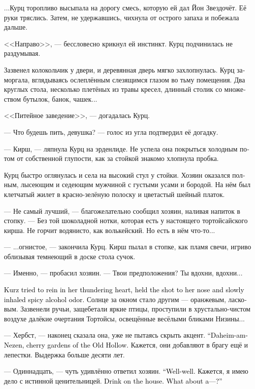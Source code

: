 \documentclass[a4paper,12pt,fleqn]{book}\usepackage{cooltooltips}\usepackage{polyglossia}\setdefaultlanguage[babelshorthands=true]{russian}\setotherlanguage{english}\defaultfontfeatures{Ligatures=TeX,Mapping=tex-text} \usepackage{xcolor}\definecolor{lightgray}{HTML}{bbbbbb}\color{lightgray}\newcommand{\ml}[3]{\textenglish{\textcolor{black}{#3}}}
\begin{document}
...Курц торопливо высыпала на дорогу смесь, которую ей дал Йон Звездочёт.
Её руки тряслись.
Затем, не удержавшись, чихнула от острого запаха и побежала дальше.

<<Направо>>, --- бессловесно крикнул ей инстинкт.
Курц подчинилась не раздумывая.

Зазвенел колокольчик у двери, и деревянная дверь мягко захлопнулась.
Курц заморгала, вглядываясь ослеплённым слезящимся глазом во тьму помещения.
Два круглых стола, несколько плетёных из травы кресел, длинный столик со множеством бутылок, банок, чашек...

<<Питейное заведение>>, --- догадалась Курц.

--- Что будешь пить, девушка? --- голос из угла подтвердил её догадку.

--- Кирш, --- ляпнула Курц на эрденлиде.
Не успела она покрыться холодным потом от собственной глупости, как за стойкой знакомо хлопнула пробка.

Курц быстро оглянулась и села на высокий стул у стойки.
Хозяин оказался полным, лысеющим и седеющим мужчиной с густыми усами и бородой.
На нём был клетчатый жилет в красно-зелёную полоску и цветастый шейный платок.

--- Не самый лучший, --- благожелательно сообщил хозяин, наливая напиток в стопку.
--- Без той шоколадной нотки, которая есть у настоящего тортойсайского кирша.
Не горчит водянисто, как волькейский.
Но есть в нём что-то...

--- ...огнистое, --- закончила Курц.
Кирш пылал в стопке, как пламя свечи, игриво облизывая темнеющий в доске стола сучок.

--- Именно, --- пробасил хозяин.
--- Твои предположения?
Ты вдохни, вдохни...

\ml{$0$}
{Курц постаралась приглушить бешено колотящееся сердце, поднесла стопку к носу и медленно вдохнула пряный спиртовой запах.}
{Kurz tried to rein in her thundering heart, held the shot to her nose and slowly inhaled spicy alcohol odor.}
Солнце за окном стало другим --- оранжевым, ласковым.
Зазвенели ручьи, защебетали яркие птицы, проступили в хрустально-чистом воздухе далёкие очертания Тортойсы, освещённые весёлыми бликами Низины...

--- Хербст, --- наконец сказала она, уже не пытаясь скрыть акцент.
\ml{$0$}
{--- Дахайм-ам-Незен, вишнёвые сады Старого Лога.}
{``Daheim-am-Nezen, cherry gardens of the Old Hollow.}
Кажется, они добавляют в брагу ещё и лепестки.
Выдержка больше десяти лет.

--- Одиннадцать, --- чуть удивлённо ответил хозяин.
\ml{$0$}
{--- Так-так.}
{``Well-well.}
Кажется, я имею дело с истинной ценительницей.
\ml{$0$}
{Выпивка за счёт заведения.}
{Drink on the house.}
\ml{$0$}
{Как насчёт?..}
{What about a---?''}
\end{document}
